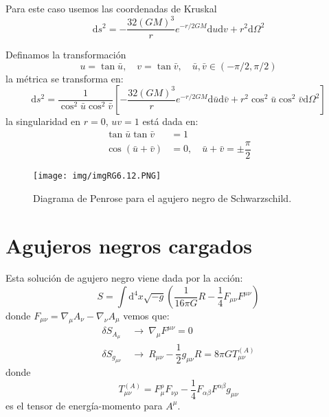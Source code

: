 \documentclass[../main]{subfiles}
\begin{document}
Para este caso usemos las coordenadas de Kruskal
\begin{equation}
    \mathrm{d}s^2=-\dfrac{32(GM)^3}{r}e^{-r/2GM}\mathrm{d}u\mathrm{d}v+r^2\mathrm{d}\Omega^2
\end{equation}

Definamos la transformación
\begin{equation}
    u=\tan \bar{u},\quad v=\tan \bar{v},\quad \bar{u}, \bar{v} \in (-\pi/2, \pi/2)
\end{equation}
la métrica se transforma en:
\begin{equation}
    \mathrm{d}s^2 = \dfrac{1}{\cos^2 \bar{u} \cos^2 \bar{v}} \left[-\dfrac{32(GM)^3}{r}e^{-r/2GM}\mathrm{d}\bar{u}\mathrm{d}\bar{v}+r^2\cos^2 \bar{u}\cos^2 \bar{v}\mathrm{d}\Omega^2\right]
\end{equation}
la singularidad en $r=0$, $uv=1$ está dada en:
\begin{equation}
    \begin{split}
        \tan \bar{u} \tan \bar{v} &=1 \\
        \cos(\bar{u}+\bar{v})&=0,\quad \bar{u}+\bar{v}=\pm \dfrac{\pi}{2}
    \end{split}
\end{equation}
\begin{figure}[h]
    \centering
    \texttt{[image: img/imgRG6.12.PNG]}
    \caption{Diagrama de Penrose para el agujero negro de Schwarzschild.}
\end{figure}

\section{Agujeros negros cargados}

Esta solución de agujero negro viene dada por la acción:
\begin{equation}
    S= \int \mathrm{d}^4 x \sqrt{-g}\left(\dfrac{1}{16\pi G}R-\dfrac{1}{4}F_{\mu\nu}F^{\mu\nu}\right)
\end{equation}
donde $F_{\mu\nu}=\nabla_{\mu} A_{\nu}-\nabla_{\nu}A_{\mu}$ vemos que:
\begin{equation}
    \begin{split}
        \delta S_{A_{\mu}} \ &\rightarrow \ \nabla_{\mu} F^{\mu\nu}=0\\
        \delta S_{g_{\mu\nu}} \ &\rightarrow \ R_{\mu\nu}-\dfrac{1}{2}g_{\mu\nu}R=8\pi G T_{\mu\nu}^{(A)} 
    \end{split}
\end{equation}
donde 
\begin{equation}
    T^{(A)}_{\mu\nu}=F^{\rho}_{\mu} F_{\nu\rho}-\dfrac{1}{4}F_{\alpha\beta}F^{\alpha\beta}g_{\mu\nu}
\end{equation}
es el tensor de energía-momento para $A^{\mu}$.
\end{document}
